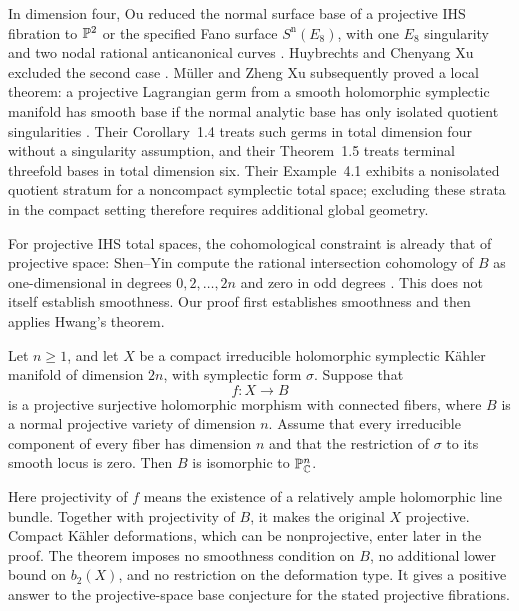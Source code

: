 In dimension four, Ou reduced the normal surface base of a projective IHS
fibration to \(\mathbb P^2\) or the specified Fano surface
\(S^{\mathrm n}(E_8)\), with one \(E_8\) singularity and two nodal rational
anticanonical curves \cite[Theorem~1.2]{Ou2019}. Huybrechts and Chenyang Xu
excluded the second case \cite[Theorem~0.1]{HuybrechtsXu2022}.
Müller and Zheng Xu subsequently proved a local theorem: a projective
Lagrangian germ from a smooth holomorphic symplectic manifold has smooth
base if the normal analytic base has only isolated quotient singularities
\cite[Theorem~1.3]{MullerXu2026}. Their Corollary~1.4 treats such germs in
total dimension four without a singularity assumption, and their
Theorem~1.5 treats terminal threefold bases in total dimension six.
Their Example~4.1 exhibits a nonisolated quotient stratum for a noncompact
symplectic total space; excluding these strata in the compact setting
therefore requires additional global geometry.

For projective IHS total spaces, the cohomological constraint is already
that of projective space: Shen--Yin compute the rational intersection
cohomology of \(B\) as one-dimensional in degrees \(0,2,\ldots,2n\) and
zero in odd degrees \cite[Theorem~0.4(a)]{ShenYin2022}. This does not itself establish
smoothness. Our proof first establishes smoothness and then applies Hwang's
theorem.

\begin{theorem}\label{thm:main}
Let \(n\geq1\), and let \(X\) be a compact irreducible holomorphic symplectic
Kähler manifold of dimension \(2n\), with symplectic form \(\sigma\).
Suppose that
\[
                       f:X\longrightarrow B
\]
is a projective surjective holomorphic morphism with connected fibers,
where \(B\) is a normal projective variety of dimension \(n\).
Assume that every irreducible component of every fiber has dimension
\(n\) and that the restriction of \(\sigma\) to its smooth locus is zero.
Then \(B\) is isomorphic to \(\mathbb P^n_{\mathbb C}\).
\end{theorem}

Here projectivity of \(f\) means the existence of a relatively ample
holomorphic line bundle. Together with projectivity of \(B\), it makes the
original \(X\) projective. Compact Kähler deformations, which can be
nonprojective, enter later in the proof. The theorem imposes no smoothness
condition on \(B\), no additional lower bound on \(b_2(X)\), and no
restriction on the deformation type. It gives a positive answer to the
projective-space base conjecture for the stated projective fibrations.

